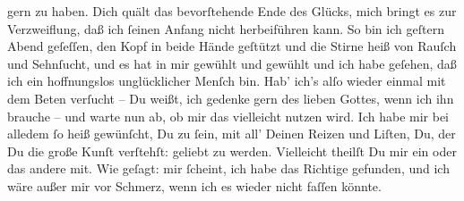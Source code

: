                gern zu haben. Dich quält das bevorſtehende Ende des Glücks, mich bringt es zur
               Verzweiflung, daß ich{ }ſeinen Anfang nicht herbeiführen kann. So bin ich geſtern{ }Abend geſeſſen, den Kopf in beide Hände geſtützt und die Stirne heiß von
               Rauſch und Sehnſucht, und es hat in mir gewühlt und gewühlt und ich habe geſehen, daß
               ich ein hoffnungslos unglücklicher Menſch bin. Hab’ ich’s alſo wieder einmal mit dem
               Beten verſucht – Du weißt, ich gedenke gern des lieben Gottes, wenn ich ihn brauche –
               und warte nun ab, ob mir das vielleicht nutzen wird. Ich habe mir bei alledem{ }ſo heiß
               gewünſcht, Du zu{ }ſein, mit all’ Deinen Reizen und \strikeout{\textcolor{gray}{Lüſten}} Liſten, Du, der Du die große Kunſt verſtehſt: geliebt zu werden. Vielleicht
               theilſt Du mir ein oder das andere \label{K_L02649-5v}\label{K_L02649-5} mit. Wie
               geſagt: mir{ }ſcheint, ich habe das Richtige gefunden, und ich wäre außer mir vor
               Schmerz, wenn ich es wieder nicht faſſen könnte.\pend
           
